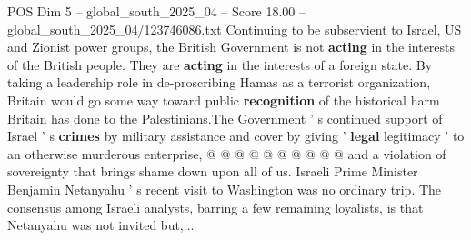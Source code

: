 \begin{textsample}{POS Dim 5 – global\_south\_2025\_04 – Score 18.00 – global\_south\_2025\_04/123746086.txt}
Continuing to be subservient to Israel, US and Zionist power groups, the British Government is not \textbf{acting} in the interests of the British people.
They are \textbf{acting} in the interests of a foreign state.
By taking a leadership role in de-proscribing Hamas as a terrorist organization, Britain would go some way toward public \textbf{recognition} of the historical harm Britain has done to the Palestinians.The Government ' s continued support of Israel ' s \textbf{crimes} by military assistance and cover by giving ' \textbf{legal} legitimacy ' to an otherwise murderous enterprise, @ @ @ @ @ @ @ @ @ @ and a violation of sovereignty that brings shame down upon all of us.
Israeli Prime Minister Benjamin Netanyahu ' s recent visit to Washington was no ordinary trip.
The consensus among Israeli analysts, barring a few remaining loyalists, is that Netanyahu was not invited but,...

\end{textsample}
